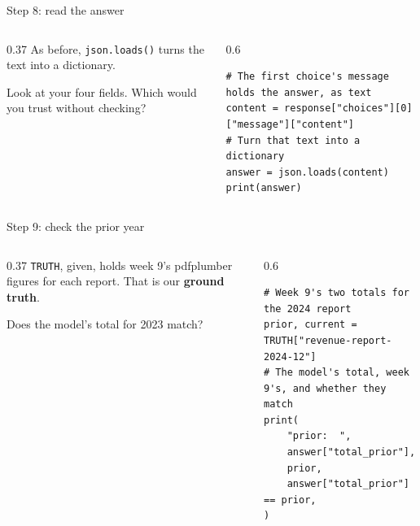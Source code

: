 \documentclass[9pt,aspectratio=169]{beamer}
\begin{document}
\begin{frame}[fragile]{Step 8: read the answer}
    \begin{columns}[T]
        \begin{column}{0.37\textwidth}
            As before, \texttt{json.loads()} turns the text into a dictionary.

            \medskip
            Look at your four fields. Which would you trust without checking?
        \end{column}
        \begin{column}{0.6\textwidth}
\begin{lstlisting}
# The first choice's message holds the answer, as text
content = response["choices"][0]["message"]["content"]
# Turn that text into a dictionary
answer = json.loads(content)
print(answer)
\end{lstlisting}
        \end{column}
    \end{columns}
\end{frame}

\begin{frame}[fragile]{Step 9: check the prior year}
    \begin{columns}[T]
        \begin{column}{0.37\textwidth}
            \texttt{TRUTH}, given, holds week 9's pdfplumber figures for each report. That is our \textbf{ground truth}.

            \medskip
            Does the model's total for 2023 match?
        \end{column}
        \begin{column}{0.6\textwidth}
\begin{lstlisting}
# Week 9's two totals for the 2024 report
prior, current = TRUTH["revenue-report-2024-12"]
# The model's total, week 9's, and whether they match
print(
    "prior:  ",
    answer["total_prior"],
    prior,
    answer["total_prior"] == prior,
)
\end{lstlisting}
        \end{column}
    \end{columns}
\end{frame}
\end{document}
